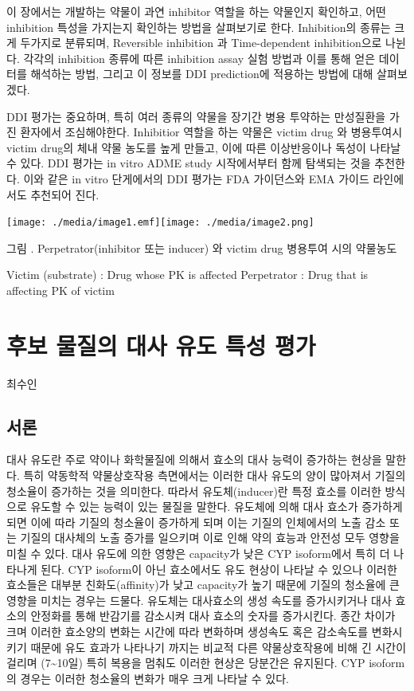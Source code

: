 \documentclass[
  11pt,
  krantz2, a4paper, twoside]{krantz}
\begin{document}
이 장에서는 개발하는 약물이 과연 inhibitor 역할을 하는 약물인지
확인하고, 어떤 inhibition 특성을 가지는지 확인하는 방법을 살펴보기로
한다. Inhibition의 종류는 크게 두가지로 분류되며, Reversible inhibition
과 Time-dependent inhibition으로 나뉜다. 각각의 inhibition 종류에 따른
inhibition assay 실험 방법과 이를 통해 얻은 데이터를 해석하는 방법,
그리고 이 정보를 DDI prediction에 적용하는 방법에 대해 살펴보겠다.

DDI 평가는 중요하며, 특히 여러 종류의 약물을 장기간 병용 투약하는
만성질환을 가진 환자에서 조심해야한다. Inhibitior 역할을 하는 약물은
victim drug 와 병용투여시 victim drug의 체내 약물 농도를 높게 만들고,
이에 따른 이상반응이나 독성이 나타날 수 있다. DDI 평가는 in vitro ADME
study 시작에서부터 함께 탐색되는 것을 추천한다. 이와 같은 in vitro
단게에서의 DDI 평가는 FDA 가이던스와 EMA 가이드 라인에서도 추천되어
진다.

\texttt{[image: ./media/image1.emf]}\texttt{[image: ./media/image2.png]}

그림 . Perpetrator(inhibitor 또는 inducer) 와 victim drug 병용투여 시의
약물농도

Victim (substrate) : Drug whose PK is affected
Perpetrator : Drug that is affecting PK of victim

\hypertarget{Induction}{%
\chapter{후보 물질의 대사 유도 특성 평가}\label{Induction}}

\Large\hfill

최수인
\normalsize

\hypertarget{uxc11cuxb860-4}{%
\section{서론}\label{uxc11cuxb860-4}}

대사 유도란 주로 약이나 화학물질에 의해서 효소의 대사 능력이 증가하는 현상을 말한다. 특히 약동학적 약물상호작용 측면에서는 이러한 대사 유도의 양이 많아져서 기질의 청소율이 증가하는 것을 의미한다.
따라서 유도체(inducer)란 특정 효소를 이러한 방식으로 유도할 수 있는 능력이 있는 물질을 말한다.
유도체에 의해 대사 효소가 증가하게 되면 이에 따라 기질의 청소율이 증가하게 되며 이는 기질의 인체에서의 노출 감소 또는 기질의 대사체의 노출 증가를 일으키며 이로 인해 약의 효능과 안전성 모두 영향을 미칠 수 있다.
대사 유도에 의한 영향은 capacity가 낮은 CYP isoform에서 특히 더 나타나게 된다. CYP isoform이 아닌 효소에서도 유도 현상이 나타날 수 있으나 이러한 효소들은 대부분 친화도(affinity)가 낮고 capacity가 높기 때문에 기질의 청소율에 큰 영향을 미치는 경우는 드물다.
유도체는 대사효소의 생성 속도를 증가시키거나 대사 효소의 안정화를 통해 반감기를 감소시켜 대사 효소의 숫자를 증가시킨다.
종간 차이가 크며 이러한 효소양의 변화는 시간에 따라 변화하며 생성속도 혹은 감소속도를 변화시키기 때문에 유도 효과가 나타나기 까지는 비교적 다른 약물상호작용에 비해 긴 시간이 걸리며 (7\textasciitilde10일) 특히 복용을 멈춰도 이러한 현상은 당분간은 유지된다. CYP isoform의 경우는 이러한 청소율의 변화가 매우 크게 나타날 수 있다.
\end{document}
